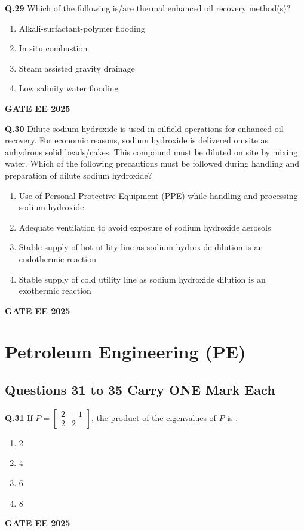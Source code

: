 \documentclass{article}
\begin{document}
\vspace{0.5cm}

\textbf{Q.29} Which of the following is/are thermal enhanced oil recovery method(s)?
\begin{enumerate}[label=(\Alph*)]
    \item Alkali-surfactant-polymer flooding
    \item In situ combustion
    \item Steam assisted gravity drainage
    \item Low salinity water flooding
\end{enumerate}
\textbf{GATE EE 2025}

\vspace{0.5cm}

\textbf{Q.30} Dilute sodium hydroxide is used in oilfield operations for enhanced oil recovery. For economic reasons, sodium hydroxide is delivered on site as anhydrous solid beads/cakes. This compound must be diluted on site by mixing water. Which of the following precautions must be followed during handling and preparation of dilute sodium hydroxide?
\begin{enumerate}[label=(\Alph*)]
    \item Use of Personal Protective Equipment (PPE) while handling and processing sodium hydroxide
    \item Adequate ventilation to avoid exposure of sodium hydroxide aerosols
    \item Stable supply of hot utility line as sodium hydroxide dilution is an endothermic reaction
    \item Stable supply of cold utility line as sodium hydroxide dilution is an exothermic reaction
\end{enumerate}
\textbf{GATE EE 2025}

\vspace{0.5cm}

\section*{Petroleum Engineering (PE)}

\subsection*{Questions 31 to 35 Carry ONE Mark Each}

\textbf{Q.31} If $P = \begin{bmatrix} 2 & -1 \\ 2 & 2 \end{bmatrix}$, the product of the eigenvalues of $P$ is \underline{\hspace{1cm}}.
\begin{enumerate}[label=(\Alph*)]
    \item 2
    \item 4
    \item 6
    \item 8
\end{enumerate}
\textbf{GATE EE 2025}
\end{document}
